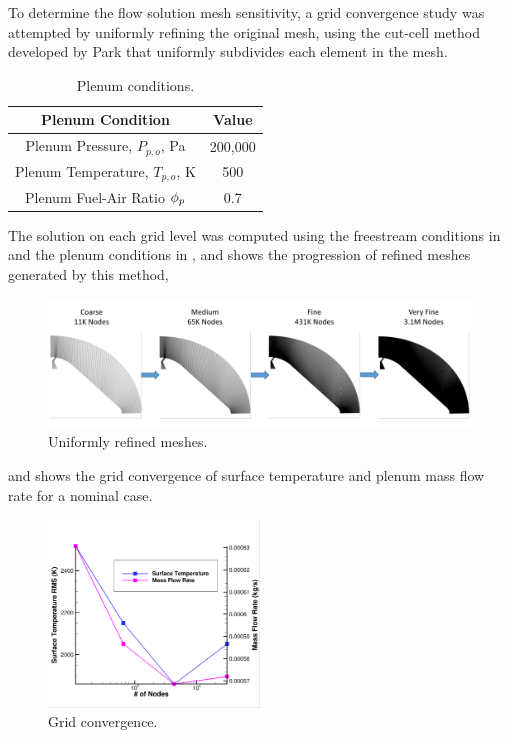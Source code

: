 To determine the flow solution mesh sensitivity, a grid convergence study was
attempted by uniformly refining the original mesh, using the cut-cell method
developed by Park\cite{park2008anisotropic} that uniformly subdivides each
element in the mesh.
\begin{table}[h]
  \centering
  \begin{tabular}{c|c}
    Plenum Condition & Value \\
    \hline
    Plenum Pressure, $P_{p,o}$, Pa   & 200,000 \\
    Plenum Temperature, $T_{p,o}$, K &  500 \\
    Plenum Fuel-Air Ratio $\phi_p$      &  0.7
  \end{tabular}
  \caption{Plenum conditions.}
  \label{tab:plenum-conditions}
\end{table}
The solution on each grid level was computed using the freestream conditions in
 and the plenum conditions in
, and  shows the progression
of refined meshes generated by this method,
\begin{figure}[h]
  \centering
  \includegraphics[width=\textwidth]{figures/mesh-progression.png}
  \caption{Uniformly refined meshes.}
  \label{fig:mesh-refined}
\end{figure}
and  shows the grid convergence of surface
temperature and plenum mass flow rate for a nominal case.
\begin{figure}[!h]
  \centering
  \includegraphics[width=0.5\textwidth]{figures/t-m-conv.png}
  \caption{Grid convergence.}
  \label{fig:grid-convergence}
\end{figure}

